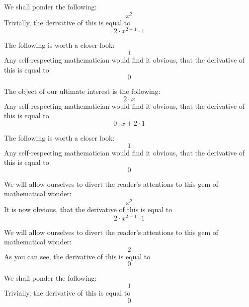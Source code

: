 \documentclass{article}
\begin{document}
We shall ponder the following:
\begin{equation}
x ^{2 } 
\end{equation}
Trivially, the derivative of this is equal to
\begin{equation}
2 \cdot x ^{2 - 1 } \cdot 1 
\end{equation}

The following is worth a closer look:
\begin{equation}
1 
\end{equation}
Any self-respecting mathematician would find it obvious, that the derivative of this is equal to
\begin{equation}
0 
\end{equation}

The object of our ultimate interest is the following:
\begin{equation}
2 \cdot x 
\end{equation}
Any self-respecting mathematician would find it obvious, that the derivative of this is equal to
\begin{equation}
0 \cdot x + 2 \cdot 1 
\end{equation}

The following is worth a closer look:
\begin{equation}
1 
\end{equation}
Any self-respecting mathematician would find it obvious, that the derivative of this is equal to
\begin{equation}
0 
\end{equation}

We will allow ourselves to divert the reader's attentions to this gem of mathematical wonder:
\begin{equation}
x ^{2 } 
\end{equation}
It is now obvious, that the derivative of this is equal to
\begin{equation}
2 \cdot x ^{2 - 1 } \cdot 1 
\end{equation}

We will allow ourselves to divert the reader's attentions to this gem of mathematical wonder:
\begin{equation}
2 
\end{equation}
As you can see, the derivative of this is equal to
\begin{equation}
0 
\end{equation}

We shall ponder the following:
\begin{equation}
1 
\end{equation}
Trivially, the derivative of this is equal to
\begin{equation}
0 
\end{equation}
\end{document}
